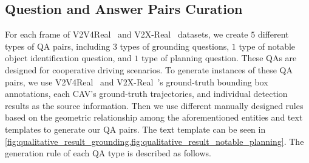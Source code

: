 \subsection{Question and Answer Pairs Curation}
For each frame of V2V4Real~\cite{xu2023v2v4real} and V2X-Real~\cite{xiang2024v2xreal} datasets, we create $5$ different types of QA pairs, including $3$ types of grounding questions,  $1$ type of notable object identification question, and $1$ type of planning question. These QAs are designed for cooperative driving scenarios. To generate instances of these QA pairs, we use V2V4Real~\cite{xu2023v2v4real} and V2X-Real~\cite{xiang2024v2xreal}'s ground-truth bounding box annotations, each CAV's ground-truth trajectories, and individual detection results as the source information. Then we use different manually designed rules based on the geometric relationship among the aforementioned entities and text templates to generate our QA pairs. The text template can be seen in \cref{fig:qualitative_result_grounding,fig:qualitative_result_notable_planning}. The generation rule of each QA type is described as follows.



